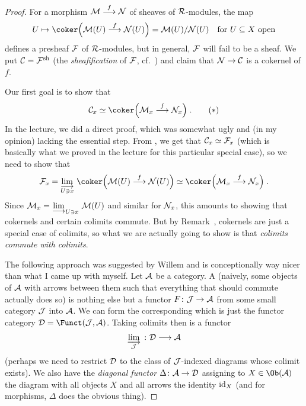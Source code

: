 \documentclass[a4paper,parskip=half,numbers=enddot, DIV=12]{scrreprt}
\begin{document}
\begin{proof}
	For a morphism $\Mm\morphism[f]\Nn$ of sheaves of $\mathcal{R}$-modules, the map 
	\begin{align*}
		U\mapsto \coker\Big(\Mm(U)\morphism[f]\Nn(U)\Big)=\Mm(U)/\Nn(U)\quad\text{for }U\subseteq X\text{ open}
	\end{align*}
	defines a presheaf $\mathcal{F}$ of $\mathcal{R}$-modules, but in general, $\mathcal{F}$ will fail to be a sheaf. We put $\mathcal{C}=\mathcal{F}^{\mathrm{sh}}$ (the \emph{sheafification} of $\mathcal{F}$, cf.\ \cite[Definition~1.2.3]{alggeo1}) and claim that $\Nn\morphism\Cc$ is a cokernel of $f$.
	
	Our first goal is to show that
	\begin{align}\lbl{eq:SheafCokernel}
		\Cc_x\simeq\coker\Big(\Mm_x\morphism[f]\Nn_x\Big)\;.\tag{$*$}
	\end{align}
	In the lecture, we did a direct proof, which was somewhat ugly and (in my opinion) lacking the essential step. From \cite[Proposition~1.2.1]{alggeo1}, we get that $\mathcal{C}_x\simeq\mathcal{F}_x$ (which is basically what we proved in the lecture for this particular special case), so we need to show that
	\begin{align*}
		\Ff_x=\colimit[U\ni x]\coker\Big(\Mm(U)\morphism[f]\Nn(U)\Big)\simeq \coker\Big(\Mm_x\morphism[f]\Nn_x\Big)\;.
	\end{align*}
	Since $\Mm_x=\colimit[U\ni x]\Mm(U)$ and similar for $\mathcal{N}_x$, this amounts to showing that cokernels and certain colimits commute. But by Remark~, cokernels are just a special case of colimits, so what we are actually going to show is that \emph{colimits commute with colimits}.
	
	The following approach was suggested by Willem and is conceptionally way nicer than what I came up with myself. Let $\mathcal{A}$ be a category. A  (naively, some objects of $\mathcal{A}$ with arrows between them such that everything that should commute actually does so) is nothing else but a functor $F\colon \Jj\morphism\Aa$ from some small category $\mathcal{J}$ into $\mathcal{A}$. We can form the corresponding  which is just the functor category $\Dd=\Funct(\Jj,\Aa)$. Taking colimits then is a functor 
	\begin{align}
		\colimit[\Jj]\colon \Dd\morphism\Aa
	\end{align}
	(perhaps we need to restrict $\mathcal{D}$ to the class of $\mathcal{J}$-indexed diagrams whose colimit exists). We also have the \emph{diagonal functor} $\Delta\colon\Aa\morphism\Dd$ assigning to $X\in\Ob(\Aa)$ the diagram with all objects $X$ and all arrows the identity $\operatorname{id}_X$ (and for morphisms, $\Delta$ does the obvious thing).
	

\end{proof}
\end{document}
